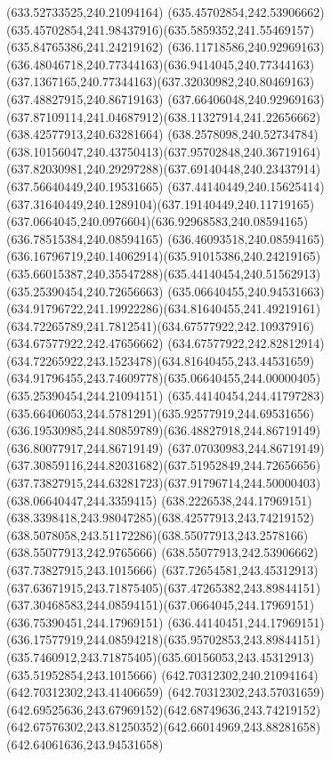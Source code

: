 {{	\lineto(633.52733525,240.21094164)
	\closepath
	\moveto(635.45702854,242.53906662)
	\curveto(635.45702854,241.98437916)(635.5859352,241.55469157)(635.84765386,241.24219162)
	\curveto(636.11718586,240.92969163)(636.48046718,240.77344163)(636.9414045,240.77344163)
	\curveto(637.1367165,240.77344163)(637.32030982,240.80469163)(637.48827915,240.86719163)
	\curveto(637.66406048,240.92969163)(637.87109114,241.04687912)(638.11327914,241.22656662)
	\lineto(638.42577913,240.63281664)
	\curveto(638.2578098,240.52734784)(638.10156047,240.43750413)(637.95702848,240.36719164)
	\curveto(637.82030981,240.29297288)(637.69140448,240.23437914)(637.56640449,240.19531665)
	\curveto(637.44140449,240.15625414)(637.31640449,240.1289104)(637.19140449,240.11719165)
	\curveto(637.0664045,240.0976604)(636.92968583,240.08594165)(636.78515384,240.08594165)
	\curveto(636.46093518,240.08594165)(636.16796719,240.14062914)(635.91015386,240.24219165)
	\curveto(635.66015387,240.35547288)(635.44140454,240.51562913)(635.25390454,240.72656663)
	\curveto(635.06640455,240.94531663)(634.91796722,241.19922286)(634.81640455,241.49219161)
	\curveto(634.72265789,241.7812541)(634.67577922,242.10937916)(634.67577922,242.47656662)
	\curveto(634.67577922,242.82812914)(634.72265922,243.1523478)(634.81640455,243.44531659)
	\curveto(634.91796455,243.74609778)(635.06640455,244.00000405)(635.25390454,244.21094151)
	\curveto(635.44140454,244.41797283)(635.66406053,244.5781291)(635.92577919,244.69531656)
	\curveto(636.19530985,244.80859789)(636.48827918,244.86719149)(636.80077917,244.86719149)
	\curveto(637.07030983,244.86719149)(637.30859116,244.82031682)(637.51952849,244.72656656)
	\curveto(637.73827915,244.63281723)(637.91796714,244.50000403)(638.06640447,244.3359415)
	\curveto(638.2226538,244.17969151)(638.3398418,243.98047285)(638.42577913,243.74219152)
	\curveto(638.5078058,243.51172286)(638.55077913,243.2578166)(638.55077913,242.9765666)
	\lineto(638.55077913,242.53906662)
	\closepath
	\moveto(637.73827915,243.1015666)
	\curveto(637.72654581,243.45312913)(637.63671915,243.71875405)(637.47265382,243.89844151)
	\curveto(637.30468583,244.08594151)(637.0664045,244.17969151)(636.75390451,244.17969151)
	\curveto(636.44140451,244.17969151)(636.17577919,244.08594218)(635.95702853,243.89844151)
	\curveto(635.7460912,243.71875405)(635.60156053,243.45312913)(635.51952854,243.1015666)
	\closepath
	\moveto(642.70312302,240.21094164)
	\lineto(642.70312302,243.41406659)
	\curveto(642.70312302,243.57031659)(642.69525636,243.67969152)(642.68749636,243.74219152)
	\curveto(642.67576302,243.81250352)(642.66014969,243.88281658)(642.64061636,243.94531658)
}}
